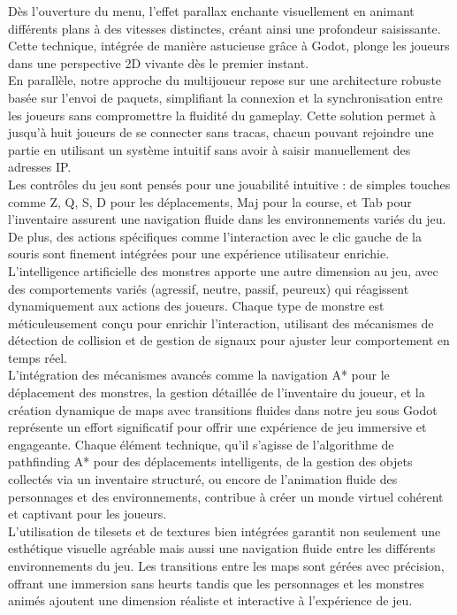 Dès l'ouverture du menu, l'effet parallax enchante visuellement en animant différents plans à des vitesses distinctes,
créant ainsi une profondeur saisissante. Cette technique, intégrée de manière astucieuse grâce à Godot, plonge les joueurs dans une perspective 2D
vivante dès le premier instant.
\\

En parallèle, notre approche du multijoueur repose sur une architecture robuste basée sur l'envoi de paquets, simplifiant
la connexion et la synchronisation entre les joueurs sans compromettre la fluidité du gameplay. Cette solution permet à jusqu'à huit joueurs
de se connecter sans tracas, chacun pouvant rejoindre une partie en utilisant un système intuitif sans avoir à saisir manuellement des adresses IP.
\\

Les contrôles du jeu sont pensés pour une jouabilité intuitive : de simples touches comme Z, Q, S, D pour les déplacements, Maj pour la course,
et Tab pour l'inventaire assurent une navigation fluide dans les environnements variés du jeu. De plus, des actions spécifiques comme l'interaction
avec le clic gauche de la souris sont finement intégrées pour une expérience utilisateur enrichie.
\\

L'intelligence artificielle des monstres apporte une autre dimension au jeu, avec des comportements variés (agressif, neutre, passif, peureux) qui
réagissent dynamiquement aux actions des joueurs. Chaque type de monstre est méticuleusement conçu pour enrichir l'interaction, utilisant des mécanismes
de détection de collision et de gestion de signaux pour ajuster leur comportement en temps réel.
\\

L'intégration des mécanismes avancés comme la navigation A* pour le déplacement des monstres, la gestion détaillée de l'inventaire du joueur, et la
création dynamique de maps avec transitions fluides dans notre jeu sous Godot représente un effort significatif pour offrir une expérience de jeu
immersive et engageante. Chaque élément technique, qu'il s'agisse de l'algorithme de pathfinding A* pour des déplacements intelligents,
de la gestion des objets collectés via un inventaire structuré, ou encore de l'animation fluide des
personnages et des environnements, contribue à créer un monde virtuel cohérent et captivant pour les joueurs.
\\

L'utilisation de tilesets et de textures bien intégrées garantit non seulement une esthétique visuelle agréable
mais aussi une navigation fluide entre les différents environnements du jeu. Les transitions entre les maps sont gérées
avec précision, offrant une immersion sans heurts tandis que les personnages et les monstres animés ajoutent une dimension réaliste et interactive à l'expérience de jeu.
\\

